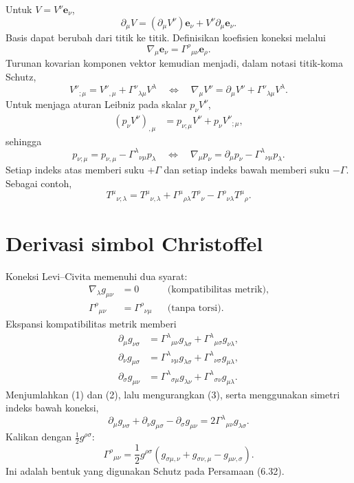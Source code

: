 \documentclass[12pt,a4paper]{report}
\newcommand{\pd}{\partial}
\newcommand{\e}{\mathbf{e}}
\begin{document}
Untuk $V=V^\nu\e_\nu$,
\[
 \pd_\mu V=(\pd_\mu V^\nu)\e_\nu+V^\nu\pd_\mu\e_\nu.
\]
Basis dapat berubah dari titik ke titik. Definisikan koefisien koneksi melalui
\[
 \nabla_\mu\e_\nu=\Gamma^\rho{}_{\mu\nu}\e_\rho.
\]
Turunan kovarian komponen vektor kemudian menjadi, dalam notasi titik-koma Schutz,
\[
 \boxed{V^\nu{}_{;\mu}
 =V^\nu{}_{,\mu}+\Gamma^\nu{}_{\lambda\mu}V^\lambda}
 \quad\Longleftrightarrow\quad
 \nabla_\mu V^\nu=\pd_\mu V^\nu+\Gamma^\nu{}_{\lambda\mu}V^\lambda.
\]
Untuk menjaga aturan Leibniz pada skalar $p_\nu V^\nu$,
\begin{align}
 (p_\nu V^\nu)_{,\mu}
 &=p_{\nu;\mu}V^\nu+p_\nu V^\nu{}_{;\mu},
\end{align}
sehingga
\[
 \boxed{p_{\nu;\mu}
 =p_{\nu,\mu}-\Gamma^\lambda{}_{\nu\mu}p_\lambda}
 \quad\Longleftrightarrow\quad
 \nabla_\mu p_\nu=\pd_\mu p_\nu-\Gamma^\lambda{}_{\nu\mu}p_\lambda.
\]
Setiap indeks atas memberi suku $+\Gamma$ dan setiap indeks bawah memberi suku
$-\Gamma$. Sebagai contoh,
\[
 T^\mu{}_{\nu;\lambda}
 =T^\mu{}_{\nu,\lambda}
 +\Gamma^\mu{}_{\rho\lambda}T^\rho{}_\nu
 -\Gamma^\rho{}_{\nu\lambda}T^\mu{}_\rho.
\]

\section{Derivasi simbol Christoffel}

Koneksi Levi--Civita memenuhi dua syarat:
\begin{align}
 \nabla_\lambda g_{\mu\nu}&=0
 &&\text{(kompatibilitas metrik)},\\
 \Gamma^\rho{}_{\mu\nu}&=\Gamma^\rho{}_{\nu\mu}
 &&\text{(tanpa torsi)}.
\end{align}
Ekspansi kompatibilitas metrik memberi
\begin{align}
 \pd_\mu g_{\nu\sigma}
 &=\Gamma^\lambda{}_{\mu\nu}g_{\lambda\sigma}
 +\Gamma^\lambda{}_{\mu\sigma}g_{\nu\lambda},\tag{1}\\
 \pd_\nu g_{\mu\sigma}
 &=\Gamma^\lambda{}_{\nu\mu}g_{\lambda\sigma}
 +\Gamma^\lambda{}_{\nu\sigma}g_{\mu\lambda},\tag{2}\\
 \pd_\sigma g_{\mu\nu}
 &=\Gamma^\lambda{}_{\sigma\mu}g_{\lambda\nu}
 +\Gamma^\lambda{}_{\sigma\nu}g_{\mu\lambda}.\tag{3}
\end{align}
Menjumlahkan (1) dan (2), lalu mengurangkan (3), serta menggunakan simetri indeks
bawah koneksi,
\[
 \pd_\mu g_{\nu\sigma}+\pd_\nu g_{\mu\sigma}-\pd_\sigma g_{\mu\nu}
 =2\Gamma^\lambda{}_{\mu\nu}g_{\lambda\sigma}.
\]
Kalikan dengan $\tfrac12g^{\rho\sigma}$:
\[
 \boxed{
 \Gamma^\rho{}_{\mu\nu}
 =\frac12g^{\rho\sigma}
 (g_{\sigma\mu,\nu}+g_{\sigma\nu,\mu}-g_{\mu\nu,\sigma})}.
\]
Ini adalah bentuk yang digunakan Schutz pada Persamaan (6.32).
\end{document}
